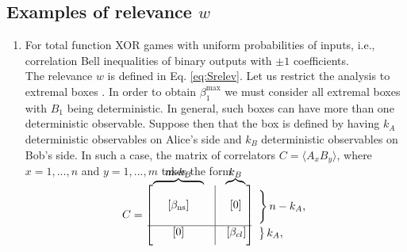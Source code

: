\documentclass[pra,twocolumn,showpacs,preprintnumbers,amsmath,amssymb,superscriptaddress]{revtex4-1}
\def\be{\begin{equation}}
\def\ee{\end{equation}}
\def\>{\rangle}
\def\<{\langle}
\def\omeas{B_1}
\def\betaMax{\beta^{\max}}
\def\relev{w}
\newcommand\bovermat[2]{%
  \makebox[0pt][l]{$\smash{\overbrace{\phantom{%
    \begin{matrix}#2\end{matrix}}}^{\text{#1}}}$}#2}
\begin{document}
\begin{appendix}
\subsection{Examples of relevance $\relev$}\label{secRELEV2}
\begin{enumerate}
\item For total function XOR games with uniform probabilities of inputs, i.e., correlation Bell inequalities of binary outputs with $\pm 1$ coefficients.\\

The relevance $\relev$ is defined in Eq. \eqref{eq:Srelev}. Let us restrict the analysis to extremal boxes \cite{JonesMasanes2005}. In order to obtain $\betaMax_1$ we must consider all extremal boxes with $\omeas$ being deterministic. In general, such boxes can have more than one deterministic observable. Suppose then that the box is defined by having $k_A$ deterministic observables on Alice's side and $k_B$ deterministic observables on Bob's side. In such a case, the matrix of correlators $C=\<A_x B_y \>$, where $x=1,...,n$ and $y=1,...,m$ takes the form\\
\be\label{Scorrmat1}
\begin{matrix}
C
 =
 \begin{bmatrix}
\bovermat{\normalsize{$m$-$k_B$}} {\begin{matrix} \text{ }&\text{ }& \text{ } \\ \text{ }&[\beta_{\text{ns}}]  &\text{ } \\ \text{ } & \text{ } & \text{ } \end{matrix}} & \vline & \hspace{-0.5em} \bovermat{\normalsize{$k_B$}}{\begin{matrix} \text{ } \\ \hspace{0.4em} [0] \\ \text{ } \end{matrix}} \\[0.5em]
%
\hline
%
\begin{matrix} \text{ } &  [0] & \text{ } \end{matrix} & \vline & \begin{matrix} [\beta_{cl}] \end{matrix} \\[0.5em]
%
  \end{bmatrix}
  \begin{aligned}
  &\left.\begin{matrix}
   \vspace{0.5em}
  \\
  \\
  \end{matrix} \right\} %
 n-k_A,\      &\begin{matrix}
  \end{matrix}\\ %
  &\left.\begin{matrix}
   \\ 
  \end{matrix}\right\}%
  k_A,\     \end{aligned}
 \end{matrix}
 \ee


\end{enumerate}
\end{appendix}
\end{document}
